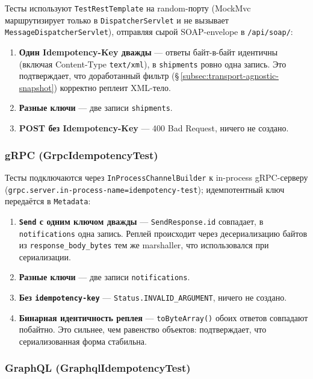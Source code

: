 Тесты используют \texttt{TestRestTemplate} на random-порту (MockMvc маршрутизирует только в \texttt{DispatcherServlet} и не вызывает \texttt{MessageDispatcherServlet}), отправляя сырой SOAP-envelope в \texttt{/api/soap/}:
\begin{enumerate}
    \item \textbf{Один Idempotency-Key дважды} --- ответы байт-в-байт идентичны (включая Content-Type \texttt{text/xml}), в \texttt{shipments} ровно одна запись. Это подтверждает, что доработанный фильтр (\S\,\ref{subsec:transport-agnostic-snapshot}) корректно реплеит XML-тело.
    \item \textbf{Разные ключи} --- две записи \texttt{shipments}.
    \item \textbf{POST без Idempotency-Key} --- 400 Bad Request, ничего не создано.
\end{enumerate}

\subsubsection{gRPC (GrpcIdempotencyTest)}

Тесты подключаются через \texttt{InProcessChannelBuilder} к in-process gRPC-серверу (\texttt{grpc.server.in-process-name=idempotency-test}); идемпотентный ключ передаётся в \texttt{Metadata}:
\begin{enumerate}
    \item \textbf{\texttt{Send} с одним ключом дважды} --- \texttt{SendResponse.id} совпадает, в \texttt{notifications} одна запись. Реплей происходит через десериализацию байтов из \texttt{response\_body\_bytes} тем же marshaller, что использовался при сериализации.
    \item \textbf{Разные ключи} --- две записи \texttt{notifications}.
    \item \textbf{Без \texttt{idempotency-key}} --- \texttt{Status.INVALID\_ARGUMENT}, ничего не создано.
    \item \textbf{Бинарная идентичность реплея} --- \texttt{toByteArray()} обоих ответов совпадают побайтно. Это сильнее, чем равенство объектов: подтверждает, что сериализованная форма стабильна.
\end{enumerate}

\subsubsection{GraphQL (GraphqlIdempotencyTest)}

